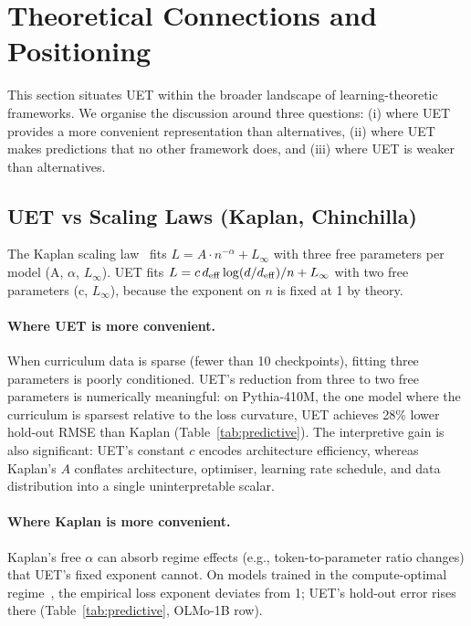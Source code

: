\section{Theoretical Connections and Positioning}
\label{sec:cross-theory}

This section situates UET within the broader landscape of learning-theoretic frameworks.
We organise the discussion around three questions:
(i) where UET provides a more convenient representation than alternatives,
(ii) where UET makes predictions that no other framework does, and
(iii) where UET is weaker than alternatives.

\subsection{UET vs Scaling Laws (Kaplan, Chinchilla)}
\label{sec:vs-scaling}

The Kaplan scaling law~\citep{kaplan2020scaling} fits
$L = A \cdot n^{-\alpha} + L_\infty$ with three free parameters per model
(A, $\alpha$, $L_\infty$).
UET fits $L = c\,d_{\mathrm{eff}} \log(d/d_{\mathrm{eff}})/n + L_\infty$ with two free parameters
(c, $L_\infty$), because the exponent on $n$ is fixed at 1 by theory.

\paragraph{Where UET is more convenient.}
When curriculum data is sparse (fewer than 10 checkpoints), fitting three
parameters is poorly conditioned.
UET's reduction from three to two free parameters is numerically meaningful:
on Pythia-410M, the one model where the curriculum is sparsest relative to
the loss curvature, UET achieves 28\% lower hold-out RMSE than Kaplan
(Table~\ref{tab:predictive}).
The interpretive gain is also significant: UET's constant $c$ encodes
architecture efficiency, whereas Kaplan's $A$ conflates architecture, optimiser,
learning rate schedule, and data distribution into a single uninterpretable scalar.

\paragraph{Where Kaplan is more convenient.}
Kaplan's free $\alpha$ can absorb regime effects (e.g., token-to-parameter ratio
changes) that UET's fixed exponent cannot.
On models trained in the compute-optimal regime~\citep{hoffmann2022chinchilla},
the empirical loss exponent deviates from 1; UET's hold-out error rises there
(Table~\ref{tab:predictive}, OLMo-1B row).


